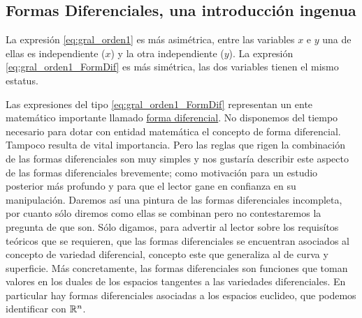 \begin{subappendices}
 

\section{Formas Diferenciales, una introducción ingenua}\label{section:fromas}





 La  expresión \eqref{eq:gral_orden1} es más asimétrica, entre las variables $x$ e $y$ una de ellas es independiente ($x$) y la otra independiente  ($y$).  La expresión \eqref{eq:gral_orden1_FormDif}  es  más simétrica, las dos variables tienen el mismo estatus.

 Las expresiones del tipo \eqref{eq:gral_orden1_FormDif} representan un ente matemático importante llamado \href{http://es.wikipedia.org/wiki/Forma_diferencial}{forma diferencial}\link. No disponemos del tiempo necesario para dotar con entidad matemática el concepto de forma diferencial. Tampoco  resulta de vital importancia. Pero las reglas que rigen la combinación de las formas diferenciales son muy simples y nos gustaría describir este aspecto de las formas diferenciales brevemente; como motivación para un estudio posterior más profundo y para que el lector gane en confianza en su manipulación. Daremos así una pintura de las formas diferenciales incompleta, por cuanto sólo diremos como ellas se combinan pero no contestaremos la pregunta de que son. Sólo digamos, para advertir al lector sobre los requisítos teóricos que se requieren, que las formas diferenciales se encuentran asociados al concepto de variedad diferencial, concepto este que generaliza al de curva y superficie.  Más 
concretamente, las formas diferenciales son funciones que toman valores en los duales de los espacios tangentes a las variedades diferenciales. En particular hay formas diferenciales asociadas a los espacios euclideo, que podemos identificar con  $\mathbb{R}^n$.


\end{subappendices}
